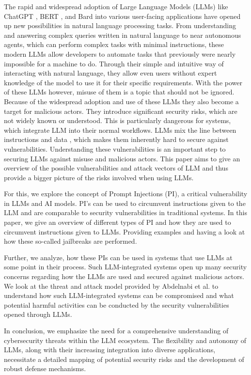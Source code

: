 \documentclass{SeminarV2}
\begin{document}
The rapid and widespread adoption of Large Language Models (LLMs) like ChatGPT \cite{openai2023gpt4}, BERT \cite{devlin2018bert}, and Bard into various user-facing applications have opened up new possibilities in natural language processing tasks. From understanding and answering complex queries written in natural language to near autonomous agents, which can perform complex tasks with minimal instructions, these modern LLMs allow developers to automate tasks that previously were nearly impossible for a machine to do. Through their simple and intuitive way of interacting with natural language, they allow even users without expert knowledge of the model to use it for their specific requirements. With the power of these LLMs however, misuse of them is a topic that should not be ignored. Because of the widespread adoption and use of these LLMs they also become a target for malicious actors. They introduce significant security risks, which are not widely known or understood. This is particularly dangerous for systems, which integrate LLM into their normal workflows. LLMs mix the line between instructions and data \cite{rao2023tricking}, which makes them inherently hard to secure against vulnerabilities. Understanding these vulnerabilities is an important step to securing LLMs against misuse and malicious actors. This paper aims to give an overview of the possible vulnerabilities and attack vectors of LLM and thus provide a bigger picture of the risks involved when using LLMs.

For this, we explore the concept of Prompt Injections (PI), a critical vulnerability in LLMs and AI models. PI's can be used to circumvent instructions given to the LLM and are comparable to security vulnerabilities in traditional systems. In this paper, we give an overview of different types of PI and how they are used to circumvent instructions given to LLMs. Providing examples and having a look at how these so-called jailbreaks are performed.  

Further, we analyze, how these PIs can be used in systems that use LLMs at some point in their process. Such LLM-integrated systems open up many security concerns regarding how the LLMs are used and secured against malicious actors. We look at the threat and attack model provided by Abdelnabi et al. \cite{abdelnabi2023not} to understand how such LLM-integrated systems can be compromised and what potential harmful activities can be conducted by the security vulnerabilities opened through LLMs.

In conclusion, we emphasize the need for a comprehensive understanding of cybersecurity threats within the LLM ecosystem. The flexibility and autonomy of LLMs, along with their increasing integration into diverse applications, necessitate a detailed mapping of potential security risks and the development of robust defense mechanisms.
\end{document}
